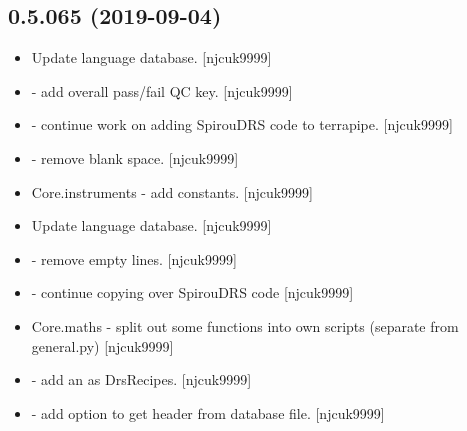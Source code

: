 \documentclass[a4paper,10pt,english]{report}
\begin{document}
\subsection{0.5.065 (2019-09-04)}
\label{\detokenize{misc/changelog:id77}}\begin{itemize}
\item {} 
Update language database. {[}njcuk9999{]}

\item {} 
 - add overall pass/fail QC key. {[}njcuk9999{]}

\item {} 
 - continue work on adding SpirouDRS code to terrapipe.
{[}njcuk9999{]}

\item {} 
 - remove blank space. {[}njcuk9999{]}

\item {} 
Core.instruments - add  constants. {[}njcuk9999{]}

\item {} 
Update language database. {[}njcuk9999{]}

\item {} 
 - remove empty lines. {[}njcuk9999{]}

\item {} 
 - continue copying over SpirouDRS code
 {[}njcuk9999{]}

\item {} 
Core.maths - split out some functions into own scripts (separate from
general.py) {[}njcuk9999{]}

\item {} 
 - add  an  as
DrsRecipes. {[}njcuk9999{]}

\item {} 
 - add option to get header from database
file. {[}njcuk9999{]}

\end{itemize}
\end{document}

